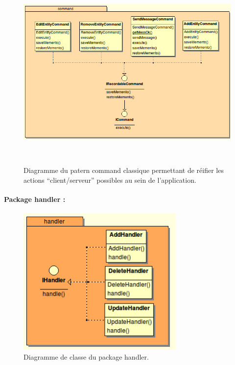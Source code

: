 \documentclass{article}
\begin{document}
\begin{figure}[hbtp]
\begin{center}
\includegraphics[height=280pt]{doc_dev-fig006.png}
\caption{Diagramme du patern command classique permettant de réifier les actions “client/serveur” possibles au sein de l’application.}
\end{center}
\end{figure}

\newpage
\paragraph{Package handler :}
\begin{figure}[htbp]
\begin{center}
\includegraphics[width=233pt, height=209pt]{doc_dev-fig007.png}
\caption{Diagramme de classe du package handler.}
\end{center}
\end{figure}
\end{document}
